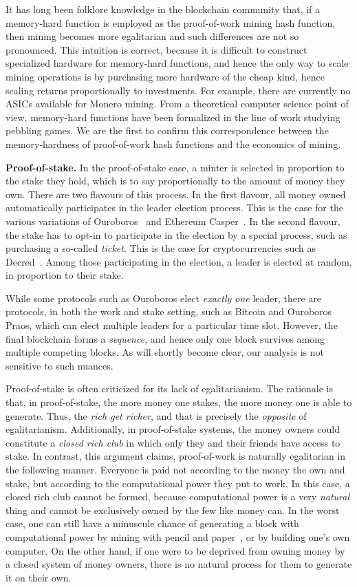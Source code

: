 It
has long been folklore knowledge in the blockchain community that, if a
memory-hard function is employed as the proof-of-work mining hash function, then
mining becomes more egalitarian and such differences are not so pronounced. This intuition is correct, because
it is difficult to construct specialized hardware for memory-hard functions, and
hence the only way to scale mining operations is by purchasing more hardware of
the cheap kind, hence scaling returns proportionally to investments. For
example, there are currently no ASICs available for Monero mining. From a theoretical computer
science point of view, memory-hard functions have been formalized in the line of
work studying pebbling games. We are the first to confirm this correspondence between the
memory-hardness of proof-of-work hash functions and the economics of mining.

\noindent\textbf{Proof-of-stake.}
In the proof-of-stake case, a minter is selected in proportion to the stake they
hold, which is to say proportionally to the amount of money they own. There are
two flavours of this process. In the first flavour, all money owned automatically participates in the leader election
process. This is the case for the various variations of Ouroboros~\cite{ouroboros}
and Ethereum Casper~\cite{casper}. In the second flavour, the stake has to opt-in to participate in
the election by a special process, such as purchasing a so-called \emph{ticket}. This is the case for cryptocurrencies such as
Decred~\cite{decred}. Among those participating in the election, a leader is
elected at random, in proportion to their stake.

While some protocols such as Ouroboros elect \emph{exactly one} leader, there
are protocols, in both the work and stake setting, such as Bitcoin and Ouroboros
Praos, which can elect multiple leaders for a particular time slot. However, the
final blockchain forms a \emph{sequence}, and hence only one block survives among multiple competing blocks.
As will shortly become clear, our analysis is not sensitive to such nuances.

Proof-of-stake is often criticized for its lack of egalitarianism. The rationale
is that, in proof-of-stake, the more money one stakes, the more money one is
able to generate. Thus, the \emph{rich get richer}, and that is precisely the
\emph{opposite} of egalitarianism. Additionally, in proof-of-stake systems, the
money owners could constitute a \emph{closed rich club} in which only they and
their friends have access to stake. In contrast, this argument claims,
proof-of-work is naturally egalitarian in the following manner. Everyone is paid
not according to the money the own and stake, but according to the computational
power they put to work. In this case, a closed rich club cannot be formed,
because computational power is a very \emph{natural} thing and cannot be
exclusively owned by the few like money can. In the worst case, one can still
have a minuscule chance of generating a block with computational power by mining
with pencil and paper~\cite{paper-mining}, or by building one's own computer. On
the other hand, if one were to be deprived from owning money by a closed system
of money owners, there is no natural process for them to generate it on their
own.

